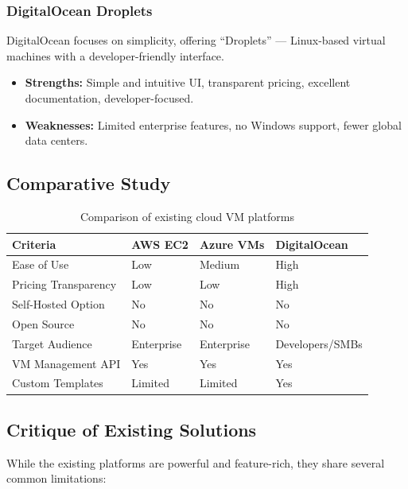 \subsubsection{DigitalOcean Droplets}

DigitalOcean focuses on simplicity, offering ``Droplets'' — Linux-based virtual machines with a developer-friendly interface.

\begin{itemize}
  \item \textbf{Strengths:} Simple and intuitive UI, transparent pricing, excellent documentation, developer-focused.
  \item \textbf{Weaknesses:} Limited enterprise features, no Windows support, fewer global data centers.
\end{itemize}

\subsection{Comparative Study}

\begin{table}[H]
\centering
\caption{Comparison of existing cloud VM platforms}
\label{tab:comparison}
\begin{tabularx}{\textwidth}{|l|X|X|X|}
\hline
\rowcolor{blue!15}
\textbf{Criteria} & \textbf{AWS EC2} & \textbf{Azure VMs} & \textbf{DigitalOcean} \\
\hline
Ease of Use & Low & Medium & High \\
\hline
Pricing Transparency & Low & Low & High \\
\hline
Self-Hosted Option & No & No & No \\
\hline
Open Source & No & No & No \\
\hline
Target Audience & Enterprise & Enterprise & Developers/SMBs \\
\hline
VM Management API & Yes & Yes & Yes \\
\hline
Custom Templates & Limited & Limited & Yes \\
\hline
\end{tabularx}
\end{table}

\subsection{Critique of Existing Solutions}

While the existing platforms are powerful and feature-rich, they share several common limitations:

